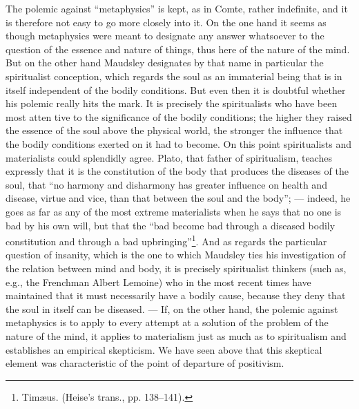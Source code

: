 \documentclass[12pt,a4paper,openany]{book}
\newcommand{\opage}[1]{\marginnote{\footnotesize\textit{[#1]}}}
\begin{document}
The polemic against ``metaphysics'' is kept, as in Comte,
rather indefinite, and it is therefore not easy to go more closely
into it. On the one hand it seems as though
metaphysics were meant to designate any answer whatsoever to
the question of the essence and nature of things, thus here
of the nature of the mind. But on the other hand
Maudsley designates by that name in particular the spiritualist conception,
which regards the soul as an immaterial being that is in
itself independent of the bodily conditions. But
even then it is doubtful whether his polemic really
hits the mark. It is precisely the spiritualists who have been most atten%
\opage{312}tive to the significance of the bodily conditions; the higher
they raised the essence of the soul above the physical world, the
stronger the influence that the bodily conditions
exerted on it had to become. On this point spiritualists and
materialists could splendidly agree. Plato, that father of
spiritualism, teaches expressly that it is the constitution of the body
that produces the diseases of the soul, that ``no harmony and
disharmony has greater influence on health and disease,
virtue and vice, than that between the soul and the body''; --- indeed, he
goes as far as any of the most extreme materialists
when he says that no one is bad by his own will, but that the ``bad
become bad through a diseased bodily constitution and through a bad upbringing''\footnote{Timæus. (Heise's trans., pp. 138--141).}. And as regards the particular question of insanity,
which is the one to which Maudsley ties his investigation
of the relation between mind and body, it is precisely
spiritualist thinkers (such as, e.g.,
the Frenchman Albert Lemoine) who in the most recent times have maintained that it must necessarily
have a bodily cause, because they deny that the soul in
itself can be diseased. --- If, on the other hand, the polemic against metaphysics
is to apply to every attempt at a solution of the problem
of the nature of the mind, it applies to materialism just as much
as to spiritualism and establishes an empirical
skepticism. We have seen above that this skeptical element
was characteristic of the point of departure of positivism.
\end{document}
